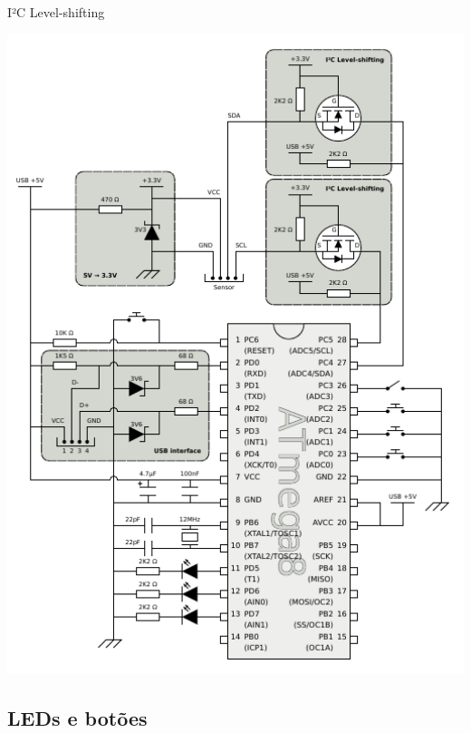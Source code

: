 \documentclass{beamer}
\begin{document}
\begin{frame}{I²C Level-shifting}
	\begin{center}
		\includegraphics[keepaspectratio, width=1.0\textwidth, height=0.8\textheight, clip, viewport=1.33in 3.56in 3.00in 4.56in]{../monografia/img/AVR-magnetometer-usb-mouse.pdf}
	\end{center}
\end{frame}


\subsection{LEDs e botões}


\end{document}
